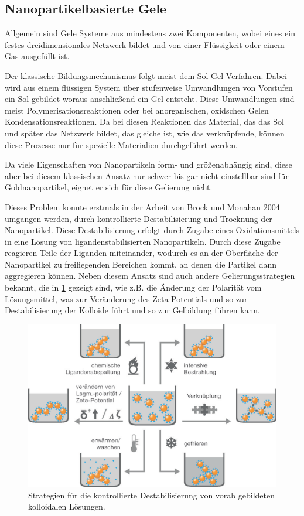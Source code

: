     
    \subsection{Nanopartikelbasierte Gele}
    
    Allgemein sind Gele Systeme aus mindestens zwei Komponenten, wobei eines ein festes dreidimensionales Netzwerk bildet und von einer Flüssigkeit oder einem Gas ausgefüllt ist. \autocite{Aleman2007}
    
    Der klassische Bildungsmechanismus folgt meist dem Sol-Gel-Verfahren. \autocite{Ziegler2017}
    Dabei wird aus einem flüssigen System über stufenweise Umwandlungen von Vorstufen ein Sol gebildet woraus anschließend ein Gel entsteht. \autocite{Aleman2007}
    Diese Umwandlungen sind meist Polymerisationsreaktionen oder bei anorganischen, oxidschen Gelen Kondensationsreaktionen. 
    Da bei diesen Reaktionen das Material, das das Sol und später das Netzwerk bildet, das gleiche ist, wie das verknüpfende, können diese Prozesse nur für spezielle Materialien durchgeführt werden.
    
    Da viele Eigenschaften von Nanopartikeln form- und größenabhängig sind, diese aber bei diesem klassischen Ansatz nur schwer bis gar nicht einstellbar sind für Goldnanopartikel, eignet er sich für diese Gelierung nicht.
    
    Dieses Problem konnte erstmals in der Arbeit von Brock und Monahan 2004 umgangen werden, durch kontrollierte Destabilisierung und Trocknung der Nanopartikel. \autocite{Mohanan2004,Mohanan2005}
    Diese Destabilisierung erfolgt durch Zugabe eines Oxidationsmittels in eine Lösung von ligandenstabilisierten Nanopartikeln.
    Durch diese Zugabe reagieren Teile der Liganden miteinander, wodurch es  an der Oberfläche der Nanopartikel zu freiliegenden Bereichen kommt, an denen die Partikel dann aggregieren können.
    Neben diesem Ansatz sind auch andere Gelierungsstrategien bekannt, die in \cref{fig:Destabilisierung} gezeigt sind, wie z.B. die Änderung der Polarität vom Lösungsmittel, was zur Veränderung des Zeta-Potentials und so zur Destabilisierung der Kolloide führt und so zur Gelbildung führen kann.
    
    \begin{figure}[H]
        \centering
        \includegraphics[width=0.6\linewidth]{Bilder/Gelierung.png}
        \caption{Strategien für die kontrollierte Destabilisierung von vorab gebildeten kolloidalen Lösungen.\autocite{Aleman2007}}
        \label{fig:Destabilisierung}
    \end{figure}
    

